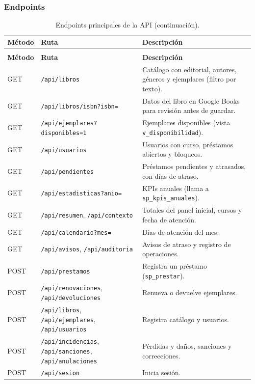 \documentclass[11pt,a4paper]{article}
\begin{document}
\subsubsection{Endpoints}
\begin{longtable}{@{}l l p{}@{}}
\caption{Endpoints principales de la API.}\\
\toprule
\textbf{Método} & \textbf{Ruta} & \textbf{Descripción}\\
\midrule
\endfirsthead
\caption[]{Endpoints principales de la API (continuación).}\\
\toprule
\textbf{Método} & \textbf{Ruta} & \textbf{Descripción}\\
\midrule
\endhead
GET & \texttt{/api/libros} & Catálogo con editorial, autores, géneros y ejemplares (filtro por texto).\\
GET & \texttt{/api/libros/isbn?isbn=} & Datos del libro en Google Books para revisión antes de guardar.\\
GET & \texttt{/api/ejemplares?disponibles=1} & Ejemplares disponibles (vista \texttt{v\_disponibilidad}).\\
GET & \texttt{/api/usuarios} & Usuarios con curso, préstamos abiertos y bloqueos.\\
GET & \texttt{/api/pendientes} & Préstamos pendientes y atrasados, con días de atraso.\\
GET & \texttt{/api/estadisticas?anio=} & KPIs anuales (llama a \texttt{sp\_kpis\_anuales}).\\
GET & \texttt{/api/resumen}, \texttt{/api/contexto} & Totales del panel inicial, cursos y fecha de atención.\\
GET & \texttt{/api/calendario?mes=} & Días de atención del mes.\\
GET & \texttt{/api/avisos}, \texttt{/api/auditoria} & Avisos de atraso y registro de operaciones.\\
POST & \texttt{/api/prestamos} & Registra un préstamo (\texttt{sp\_prestar}).\\
POST & \texttt{/api/renovaciones}, \texttt{/api/devoluciones} & Renueva o devuelve ejemplares.\\
POST & \texttt{/api/libros}, \texttt{/api/ejemplares}, \texttt{/api/usuarios} & Registra catálogo y usuarios.\\
POST & \texttt{/api/incidencias}, \texttt{/api/sanciones}, \texttt{/api/anulaciones} & Pérdidas y daños, sanciones y correcciones.\\
POST & \texttt{/api/sesion} & Inicia sesión.\\
\bottomrule
\end{longtable}
\end{document}
